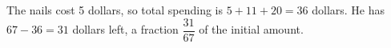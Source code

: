The nails cost 5 dollars, so total spending is $5+11+20=36$ dollars. He has $67-36=31$ dollars left, a fraction $\boxed{\dfrac{31}{67}}$ of the initial amount.
